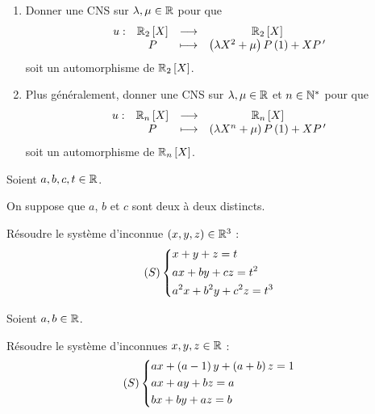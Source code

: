 \begin{corr}
\end{corr}

\begin{exo}
\begin{enumerate}
\item Donner une CNS sur \(\lambda,\mu\in\mathbb{R}\) pour que \[\fonction{u}{\polydeg[\R]{2}}{\polydeg[\R]{2}}{P}{\paren{\lambda X^2+\mu}P\paren{1}+XP\prim}\] soit un automorphisme de \(\polydeg[\R]{2}\). \\

\item Plus généralement, donner une CNS sur \(\lambda,\mu\in\mathbb{R}\) et \(n\in\mathbb{N}^*\) pour que \[\fonction{u}{\polydeg[\R]{n}}{\polydeg[\R]{n}}{P}{\paren{\lambda X^n+\mu}P\paren{1}+XP\prim}\] soit un automorphisme de \(\polydeg[\R]{n}\).
\end{enumerate}
\end{exo}

\begin{corr}
\end{corr}

\begin{exo}
Soient \(a,b,c,t\in\mathbb{R}\).

On suppose que \(a\), \(b\) et \(c\) sont deux à deux distincts.

Résoudre le système d'inconnue \(\left(x,y,z\right)\in\mathbb{R}^3\) : \[\left(S\right)\begin{dcases}
x+y+z=t \\
ax+by+cz=t^2 \\
a^2x+b^2y+c^2z=t^3
\end{dcases}\]
\end{exo}

\begin{corr}
\end{corr}

\begin{exo}
Soient \(a,b\in\mathbb{R}\).

Résoudre le système d'inconnues \(x,y,z\in\mathbb{R}\) : \[\left(S\right)\begin{dcases}
ax+\left(a-1\right)y+\left(a+b\right)z=1 \\
ax+ay+bz=a \\
bx+by+az=b
\end{dcases}\]
\end{exo}

\begin{corr}
\end{corr}

